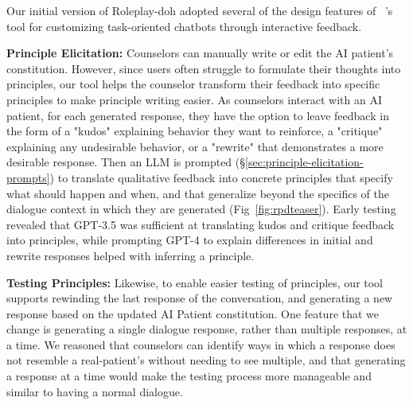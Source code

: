 \documentclass[11pt]{article}
\begin{document}
Our initial version of Roleplay-doh 
adopted several of the design features of ~\citet{petridis2023constitutionmaker}'s tool for customizing task-oriented chatbots through interactive feedback. 

\textbf{Principle Elicitation:} Counselors can manually write or edit the AI patient's constitution. However, since users often struggle to formulate their thoughts into principles, our tool helps the counselor transform their feedback into specific principles to make principle writing easier. As counselors interact with an AI patient, for each generated response, they have the option to leave feedback in the form of a "kudos" explaining behavior they want to reinforce, a "critique" explaining any undesirable behavior, or a "rewrite" that demonstrates a more desirable response. Then an LLM is prompted (\S\ref{sec:principle-elicitation-prompts}) to translate qualitative feedback into concrete principles that specify what should happen and when, and that generalize beyond the specifics of the dialogue context in which they are generated (Fig~\ref{fig:rpdteaser}).
Early testing revealed that GPT-3.5 was sufficient at translating kudos and critique feedback into principles, while prompting GPT-4 to explain differences in initial and rewrite responses helped with inferring a principle.  

\textbf{Testing Principles:} Likewise, to enable easier testing of principles, our tool supports rewinding the last response of the conversation, and generating a new response based on the updated AI Patient constitution. 
One feature that we change is generating a single dialogue response, rather than multiple responses, at a time. We reasoned that counselors can identify ways in which a response does not resemble a real-patient's without needing to see multiple, and that generating a response at a time would make the testing process more manageable and similar to having a normal dialogue. 
\end{document}
